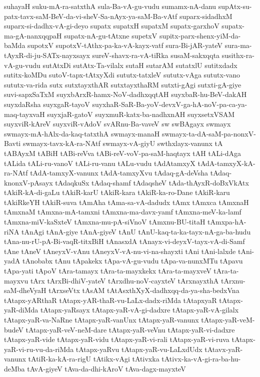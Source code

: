 {suhayaH
suku-mA-ra-satxthA
sula-Ba-vA-gu-vudu
sumamx-nA-danu
supAtx-su-patx-tavx-saM-BeV-da-vi-sheV-Sa-nAyx-ya-saM-Ba-vAtf
suparx-sidadhxM
suparx-si-dadhx-vA-gi-deyo
supatx
supatxH
supatxM
supatx-garxhoV
supatx-ma-gA-nanxqqpaH
supatx-nA-gu-tAtxne
supetxV
supitx-parx-shenx-yiM-da-baMda
supotxV
supotxV-tAthx-pa-ka-vA-kayx-vatf
sura-Bi-jAR-yateV
sura-ma-tAyxR-di-ju-SATx-nayxsayx
sureV-shavx-ra-vA-tiRka
susaM-sakxqqta
susithx-ra-vA-gu-vudu
sutAtxDi
sutAtx-Ta-vilalx
sutaH
sutarAM
sutatxlU
sutitxdadx
sutitx-koMDu
sutoV-tapx-tAtxyXdi
sututx-tatxleV
sututx-vAga
sututx-vano
sututx-va-rida
sutx
sutxtayxthAR
sutxtayxthaRM
sutxti-gAgi
sutxti-gA-giye
suvi-sapxSaTxM
suyxbArxR-hamx-NoV-dadhxqqtAH
suyxbaR-hu-BeV-dakAH
suyxdaRsha
suyxgaR-tayoV
suyxhaR-SaR-Ba-yoV-devxV-ga-hA-noV-pa-ca-ya-maq-tayxvaH
suyxjaR-gatoV
suyxmuR-katx-ba-nadhxnAH
suyxsetxVSAM
suyxviR-kAreV
suyxviR-vAdoV
svARnu-Ba-vaveV
sw
swBAgayx
swmayx
swmayx-mA-hAlx-da-kaq-tatxthA
swmayx-manaH
swmayx-ta-dA-saM-pa-nonxV-Bavti
swmayx-tavx-kA-ra-NAtf
swmayx-vA-giyU
swthxlayx-vanunx
tA
tABAyxM
tABiH
tABi-reVva
tABi-reV-voV-pa-saM-haqtayx
tAH
tALi-dAga
tALida
tALi-ru-vanoV
tALi-ru-vanu
tALu-vudu
tAdAtamxyX
tAdA-tamxyX-kA-ra-NAtf
tAdA-tamxyX-vanunx
tAdA-tamxyXvu
tAdaq-gA-deVsha
tAdaq-knonxV-pAsayx
tAdaqkuSx
tAdaq-shamf
tAdaqsheV
tAda-thAyxR-doBxVkAtx
tAkiR-kA-di-gaLu
tAkiR-karU
tAkiR-kara
tAkiR-ka-ro-Dane
tAkiR-karu
tAkiRkeYH
tAkiR-suva
tAmAha
tAma-sa-vA-dadudx
tAmx
tAmxca
tAmxnaH
tAmxnaM
tAmxna-mA-tamxni
tAmxna-ma-davx-yamf
tAmxna-meV-ka-lamf
tAmxna-miV-kaSxteV
tAmxna-mu-pA-siVnoV
tAmxnu-BU-titaH
tAmxpa-hA-riNA
tAnAgi
tAnA-giye
tAnA-giyeV
tAnU
tAnU-kaq-ta-ka-tayx-nA-ga-ba-hudu
tAna-nu-rU-pA-Bi-vaqR-titxBiH
tAnasxdA
tAnayx-vi-deyxV-tayx-vA-di-Samf
tAne
tAneV
tAneyxV-vAnu
tAneyxV-vA-nu-vi-na-shayxti
tAni
tAni-lalxde
tAni-yadA
tAnobabx
tAnu
tApakekx
tApa-vA-gu-vudu
tApa-va-nunxMTu
tApavu
tApa-yati
tApoV
tAra-tamayx
tAra-ta-mayxkekx
tAra-ta-mayxveV
tAra-ta-mayxvu
tArx
tArxBi-dhiV-yateV
tArxdhu-noV-cayxteV
tArxnayxthA
tArxnu-saM-dheVyaH
tArxseVtx
tAsAM
tAtAsxthXyX-dadhxqq-da-ya-sha-bedxVna
tAtapx-yARthaR
tAtapx-yAR-thaR-vu-LaLx-dadx-riMda
tAtapxyaR
tAtapx-yaR-diMda
tAtapx-yaRsayx
tAtapx-yaR-vA-gi-dadxre
tAtapx-yaR-vA-gilalx
tAtapx-yaR-va-NaRne
tAtapx-yaR-vanUnx
tAtapx-yaR-vanunx
tAtapx-yaR-veM-budeV
tAtapx-yaR-veV-neM-dare
tAtapx-yaR-veVnu
tAtapx-yaR-vi-dadxre
tAtapx-yaR-vide
tAtapx-yaR-vidu
tAtapx-yaR-vi-rali
tAtapx-yaR-vi-ruva
tAtapx-yaR-vi-ru-vu-da-riMda
tAtapx-yaRvu
tAtapx-yaR-vu-LaLxdUdx
tAtavx-yaR-vanunx
tAtiR-ka-kA-ra-rigU
tAtikx-vAgi
tAtivxka
tAtivx-ka-vA-gi-ra-ba-hu-deMba
tAvA-giyeV
tAva-da-dhi-kAroV
tAva-dagx-mayxteV
}
